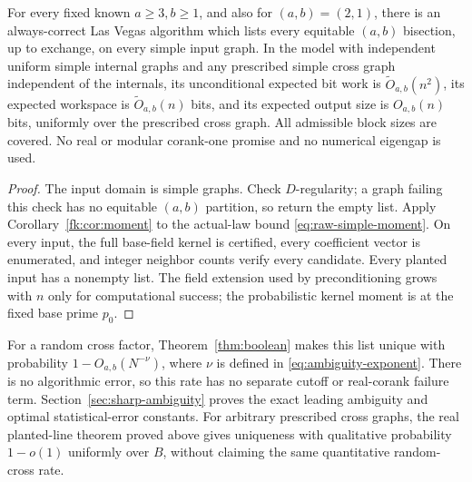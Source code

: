 \begin{theorem}\label{thm:fast-full-list}
For every fixed known $a\ge3,b\ge1$, and also for $(a,b)=(2,1)$,
there is an always-correct Las Vegas
algorithm which lists every equitable $(a,b)$ bisection, up to exchange,
on every simple input graph. In the model with independent uniform simple
internal graphs and any prescribed simple cross graph independent
of the internals, its unconditional expected bit work is
$\widetilde O_{a,b}(n^2)$, its expected workspace is
$\widetilde O_{a,b}(n)$ bits, and its expected output size is
$O_{a,b}(n)$ bits, uniformly over the prescribed cross graph.
All admissible block sizes are covered. No real or modular corank-one
promise and no numerical eigengap is used.
\end{theorem}
\begin{proof}
The input domain is simple graphs. Check $D$-regularity; a graph
failing this check has no equitable $(a,b)$ partition, so return the empty list.
Apply Corollary~\ref{fk:cor:moment} to the actual-law bound
\eqref{eq:raw-simple-moment}. On every input, the full base-field
kernel is certified, every coefficient vector is enumerated, and
integer neighbor counts verify every candidate. Every planted input
has a nonempty list. The field extension used by preconditioning
grows with $n$ only for computational success; the probabilistic
kernel moment is at the fixed base prime $p_0$.
\end{proof}

For a random cross factor, Theorem~\ref{thm:boolean} makes this list
unique with probability $1-O_{a,b}(N^{-\nu})$, where
$\nu$ is defined in \eqref{eq:ambiguity-exponent}.
There is no algorithmic error, so this rate has no separate cutoff or
real-corank failure term. Section~\ref{sec:sharp-ambiguity} proves
the exact leading ambiguity and optimal statistical-error constants.
For arbitrary prescribed cross graphs, the real planted-line theorem
proved above gives uniqueness with qualitative probability $1-o(1)$ uniformly
over $B$, without claiming the same quantitative random-cross rate.

